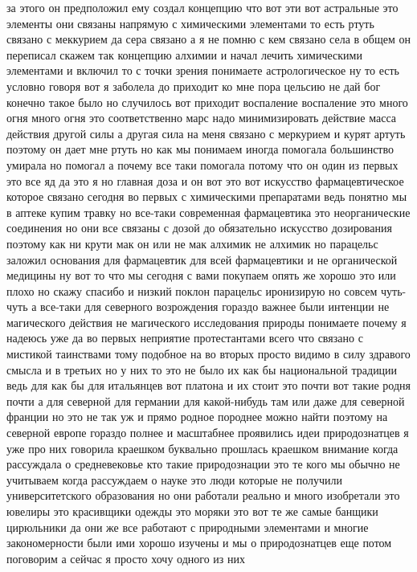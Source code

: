 за этого он предположил ему создал концепцию что вот эти вот астральные это
элементы они связаны напрямую с химическими элементами то есть ртуть связано с
меккурием да сера связано а я не помню с кем связано села в общем он переписал
скажем так концепцию алхимии и начал лечить химическими элементами и включил то
с точки зрения понимаете астрологическое ну то есть условно говоря вот я
заболела до приходит ко мне пора цельсию не дай бог конечно такое было но
случилось вот приходит воспаление воспаление это много огня много огня это
соответственно марс надо минимизировать действие масса действия другой силы а
другая сила на меня связано с меркурием и курят артуть поэтому он дает мне ртуть
но как мы понимаем иногда помогала большинство умирала но помогал а почему все
таки помогала потому что он один из первых это все яд да это я но главная доза и
он вот это вот искусство фармацевтическое которое связано сегодня во первых с
химическими препаратами ведь понятно мы в аптеке купим травку но все-таки
современная фармацевтика это неорганические соединения но они все связаны с
дозой до обязательно искусство дозирования поэтому как ни крути мак он или не
мак алхимик не алхимик но парацельс заложил основания для фармацевтик для всей
фармацевтики и не органической медицины ну вот то что мы сегодня с вами покупаем
опять же хорошо это или плохо но скажу спасибо и низкий поклон парацельс
иронизирую но совсем чуть-чуть а все-таки для северного возрождения гораздо
важнее были интенции не магического действия не магического исследования природы
понимаете почему я надеюсь уже да во первых неприятие протестантами всего что
связано с мистикой таинствами тому подобное на во вторых просто видимо в силу
здравого смысла и в третьих но у них то это не было их как бы национальной
традиции ведь для как бы для итальянцев вот платона и их стоит это почти вот
такие родня почти а для северной для германии для какой-нибудь там или даже для
северной франции но это не так уж и прямо родное породнее можно найти поэтому на
северной европе гораздо полнее и масштабнее проявились идеи природознатцев я уже
про них говорила краешком буквально прошлась краешком внимание когда рассуждала
о средневековье кто такие природознации это те кого мы обычно не учитываем когда
рассуждаем о науке это люди которые не получили университетского образования но
они работали реально и много изобретали это ювелиры это красивщики одежды это
моряки это вот те же самые банщики цирюльники да они же все работают с
природными элементами и многие закономерности были ими хорошо изучены и мы о
природознатцев еще потом поговорим а сейчас я просто хочу одного из них
